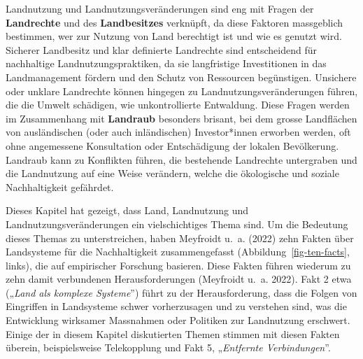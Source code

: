 \documentclass[
  nswissgerman,
  a4paper,
  openany]{book}
\begin{document}
\begin{tcolorbox}[enhanced jigsaw, arc=.35mm, bottomrule=.15mm, bottomtitle=1mm, breakable, colback=white, colbacktitle=quarto-callout-note-color!10!white, colframe=quarto-callout-note-color-frame, coltitle=black, left=2mm, leftrule=.75mm, opacityback=0, opacitybacktitle=0.6, rightrule=.15mm, title={Landrechte und Landbesitz}, titlerule=0mm, toprule=.15mm, toptitle=1mm]

Landnutzung und Landnutzungsveränderungen sind eng mit Fragen der
\textbf{Landrechte} und des \textbf{Landbesitzes} verknüpft, da diese
Faktoren massgeblich bestimmen, wer zur Nutzung von Land berechtigt ist
und wie es genutzt wird. Sicherer Landbesitz und klar definierte
Landrechte sind entscheidend für nachhaltige Landnutzungspraktiken, da
sie langfristige Investitionen in das Landmanagement fördern und den
Schutz von Ressourcen begünstigen. Unsichere oder unklare Landrechte
können hingegen zu Landnutzungsveränderungen führen, die die Umwelt
schädigen, wie unkontrollierte Entwaldung. Diese Fragen werden im
Zusammenhang mit \textbf{Landraub} besonders brisant, bei dem grosse
Landflächen von ausländischen (oder auch inländischen) Investor*innen
erworben werden, oft ohne angemessene Konsultation oder Entschädigung
der lokalen Bevölkerung. Landraub kann zu Konflikten führen, die
bestehende Landrechte untergraben und die Landnutzung auf eine Weise
verändern, welche die ökologische und soziale Nachhaltigkeit gefährdet.

\end{tcolorbox}

Dieses Kapitel hat gezeigt, dass Land, Landnutzung und
Landnutzungsveränderungen ein vielschichtiges Thema sind. Um die
Bedeutung dieses Themas zu unterstreichen, haben {Meyfroidt u.~a.}
(2022) zehn Fakten über Landsysteme für die Nachhaltigkeit
zusammengefasst (Abbildung~\ref{fig-ten-facts}, links), die auf
empirischer Forschung basieren. Diese Fakten führen wiederum zu zehn
damit verbundenen Herausforderungen ({Meyfroidt u.~a.} 2022). Fakt 2
etwa („\emph{Land als komplexe Systeme}'') führt zu der Herausforderung,
dass die Folgen von Eingriffen in Landsysteme schwer vorherzusagen und
zu verstehen sind, was die Entwicklung wirksamer Massnahmen oder
Politiken zur Landnutzung erschwert. Einige der in diesem Kapitel
diskutierten Themen stimmen mit diesen Fakten überein, beispielsweise
Telekopplung und Fakt 5, „\emph{Entfernte Verbindungen}''.
\end{document}
